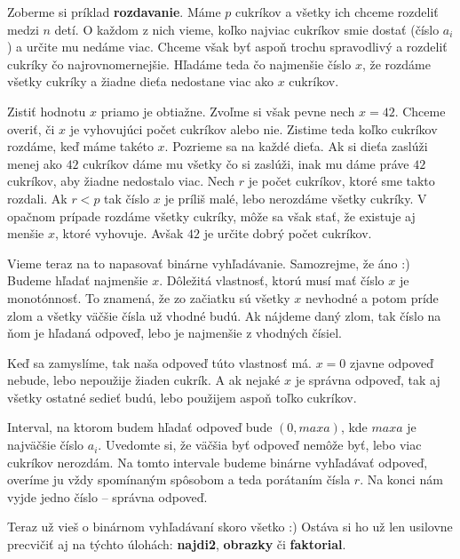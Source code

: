 Zoberme si príklad \textbf{rozdavanie}. Máme $p$ cukríkov a všetky ich chceme rozdeliť medzi $n$
detí. O každom z nich vieme, koľko najviac cukríkov smie dostať (číslo $a_i$) a určite mu nedáme
viac. Chceme však byť aspoň trochu spravodlivý a rozdeliť cukríky čo najrovnomernejšie. Hľadáme teda
čo najmenšie číslo $x$, že rozdáme všetky cukríky a žiadne dieťa nedostane viac ako $x$ cukríkov.

Zistiť hodnotu $x$ priamo je obtiažne. Zvoľme si však pevne nech $x = 42$. Chceme overiť, či $x$ je
vyhovujúci počet cukríkov alebo nie. Zistime teda koľko cukríkov rozdáme, keď máme takéto $x$.
Pozrieme sa na každé dieťa. Ak si dieťa zaslúži menej ako $42$ cukríkov dáme mu všetky čo si
zaslúži, inak mu dáme práve $42$ cukríkov, aby žiadne nedostalo viac. Nech $r$ je počet cukríkov,
ktoré sme takto rozdali. Ak $r < p$ tak číslo $x$ je príliš malé, lebo nerozdáme všetky cukríky. V
opačnom prípade rozdáme všetky cukríky, môže sa však stať, že existuje aj menšie $x$, ktoré
vyhovuje. Avšak $42$ je určite dobrý počet cukríkov.

Vieme teraz na to napasovať binárne vyhľadávanie. Samozrejme, že áno :) Budeme hľadať najmenšie $x$.
Dôležitá vlastnosť, ktorú musí mať číslo $x$ je monotónnosť. To znamená, že zo začiatku sú všetky
$x$ nevhodné a potom príde zlom a všetky väčšie čísla už vhodné budú. Ak nájdeme daný zlom, tak
číslo na ňom je hľadaná odpoveď, lebo je najmenšie z vhodných čísiel.

Keď sa zamyslíme, tak naša odpoveď túto vlastnosť má. $x = 0$ zjavne odpoveď nebude, lebo nepoužije
žiaden cukrík. A ak nejaké $x$ je správna odpoveď, tak aj všetky ostatné sedieť budú, lebo použijem
aspoň toľko cukríkov.

Interval, na ktorom budem hľadať odpoveď bude $(0, maxa)$, kde $maxa$ je najväčšie číslo $a_i$.
Uvedomte si, že väčšia byť odpoveď nemôže byť, lebo viac cukríkov nerozdám. Na tomto intervale
budeme binárne vyhľadávať odpoveď, overíme ju vždy spomínaným spôsobom a teda porátaním čísla $r$.
Na konci nám vyjde jedno číslo -- správna odpoveď.

\medskip

Teraz už vieš o binárnom vyhľadávaní skoro všetko :) Ostáva si ho už len usilovne precvičiť aj na
týchto úlohách: \textbf{najdi2}, \textbf{obrazky} či \textbf{faktorial}.



